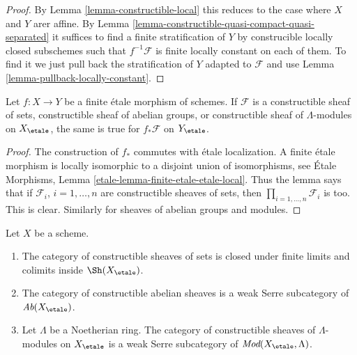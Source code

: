 \begin{proof}
By Lemma \ref{lemma-constructible-local} this reduces to the case
where $X$ and $Y$ arer affine. By
Lemma \ref{lemma-constructible-quasi-compact-quasi-separated}
it suffices to find a finite stratification of $Y$ by construcible
locally closed subschemes such that $f^{-1}\mathcal{F}$ is finite locally
constant on each of them.
To find it we just pull back the stratification of $Y$ adapted to
$\mathcal{F}$ and use
Lemma \ref{lemma-pullback-locally-constant}.
\end{proof}

\begin{lemma}
\label{lemma-pushforward-constructible}
Let $f : X \to Y$ be a finite \'etale morphism of schemes.
If $\mathcal{F}$ is a constructible sheaf of sets,
constructible sheaf of abelian groups, or constructible
sheaf of $\Lambda$-modules on $X_\etale$, the same is
true for $f_*\mathcal{F}$ on $Y_\etale$.
\end{lemma}

\begin{proof}
The construction of $f_*$ commutes with \'etale localization.
A finite \'etale morphism is locally isomorphic to a disjoint union
of isomorphisms, see
\'Etale Morphisms, Lemma \ref{etale-lemma-finite-etale-etale-local}.
Thus the lemma says that if $\mathcal{F}_i$, $i = 1, \ldots, n$
are constructible sheaves of sets, then
$\prod_{i = 1, \ldots, n} \mathcal{F}_i$ is too.
This is clear. Similarly for sheaves of abelian groups and modules.
\end{proof}

\begin{lemma}
\label{lemma-constructible-abelian}
Let $X$ be a scheme.
\begin{enumerate}
\item The category of constructible sheaves of sets
is closed under finite limits and colimits inside $\Sh(X_\etale)$.
\item The category of constructible abelian sheaves is a
weak Serre subcategory of $\textit{Ab}(X_\etale)$.
\item Let $\Lambda$ be a Noetherian ring. The category of
constructible sheaves of $\Lambda$-modules on
$X_\etale$ is a weak Serre subcategory of
$\textit{Mod}(X_\etale, \Lambda)$.
\end{enumerate}
\end{lemma}

